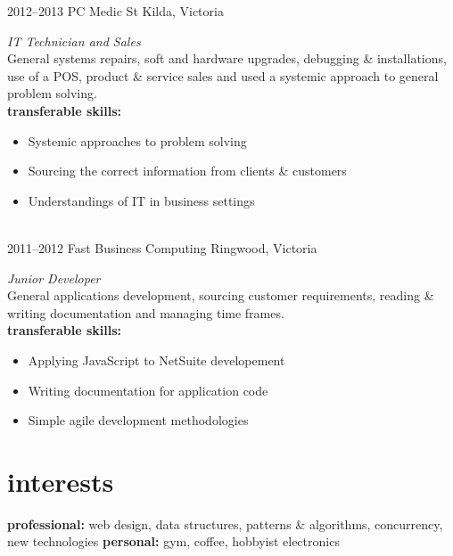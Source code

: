 \documentclass[]{friggeri-cv} %
\begin{document}
\begin{entrylist}
\entry
{2012--2013}
{PC Medic}
{St Kilda, Victoria}
{\emph{IT Technician and Sales} \\
General systems repairs, soft and hardware upgrades, debugging \& installations, use of a POS, product \& service sales
and used a systemic approach to general problem solving. \\

\textbf{transferable skills:}
\begin{itemize}
    \item Systemic approaches to problem solving
    \item Sourcing the correct information from clients \& customers
    \item Understandings of IT in business settings
\end{itemize}
}
\\ %
\entry
{2011--2012}
{Fast Business Computing}
{Ringwood, Victoria}
{\emph{Junior Developer} \\
General applications development, sourcing customer requirements, reading \& writing documentation and managing time frames. \\

\textbf{transferable skills:}
\begin{itemize}
    \item Applying JavaScript to NetSuite developement
    \item Writing documentation for application code
    \item Simple agile development methodologies
\end{itemize}
}
\end{entrylist}

\section{interests}

\textbf{professional:} web design, data structures, patterns \& algorithms, concurrency, new technologies \textbf{personal:} gym, coffee, hobbyist electronics
\end{document}
